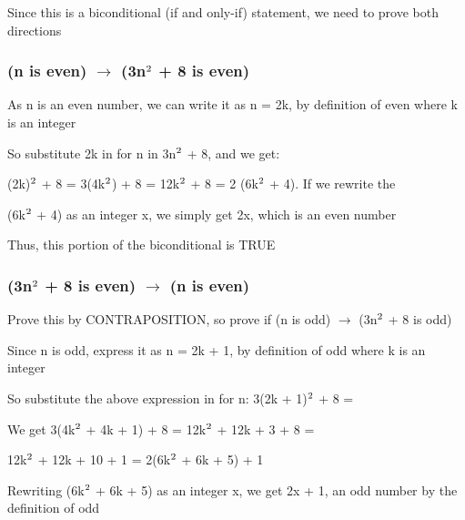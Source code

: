 \documentclass{article}
\begin{document}
Since this is a biconditional (if and only-if) statement, we need to prove both directions

\subsubsection{(n is even) $\rightarrow$ (3n$\textsuperscript{2}$ + 8 is even)}

As n is an even number, we can write it as n = 2k, by definition of even where k is an integer

\par\vspace{0.5cm}\noindent So substitute 2k in for n in 3n$\textsuperscript{2}$ + 8, and we get:

\par\vspace{0.5cm}(2k)$\textsuperscript{2}$ + 8 = 3(4k$\textsuperscript{2}$) + 8 = 12k$\textsuperscript{2}$ + 8 = 2 (6k$\textsuperscript{2}$ + 4).  If we rewrite the \par\noindent(6k$\textsuperscript{2}$ + 4) as an integer x, we simply get 2x, which is an even number
\par\vspace{0.5cm}\noindent Thus, this portion of the biconditional is TRUE

\subsubsection{(3n$\textsuperscript{2}$ + 8 is even) $\rightarrow$ (n is even)}

Prove this by CONTRAPOSITION, so prove if (n is odd) $\rightarrow$ (3n$\textsuperscript{2}$ + 8 is odd)

\par\vspace{0.5cm}\noindent Since n is odd, express it as n = 2k + 1, by definition of odd where k is an integer
\par\vspace{0.5cm}\noindent So substitute the above expression in for n: 3(2k + 1)$\textsuperscript{2}$ + 8 = \par\noindent We get 3(4k$\textsuperscript{2}$ + 4k + 1) + 8 = 12k$\textsuperscript{2}$ + 12k + 3 + 8 = \par\noindent
12k$\textsuperscript{2}$ + 12k + 10 + 1 = 2(6k$\textsuperscript{2}$ + 6k + 5) + 1

\par\vspace{0.5cm}\noindent Rewriting (6k$\textsuperscript{2}$ + 6k + 5) as an integer x, we get 2x + 1, an odd number by the definition of odd
\end{document}
